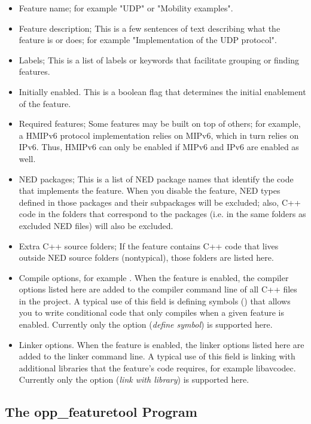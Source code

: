 \begin{itemize}
  \item Feature name; for example "UDP" or "Mobility examples".
  \item Feature description; This is a few sentences of text describing what the feature
    is or does; for example "Implementation of the UDP protocol".
  \item Labels; This is a list of labels or keywords that facilitate grouping or finding features.
  \item Initially enabled. This is a boolean flag that determines the initial enablement
    of the feature.
\item Required features; Some features may be built on top of others; for example, a HMIPv6
    protocol implementation relies on MIPv6, which in turn relies on IPv6. Thus, HMIPv6 can
    only be enabled if MIPv6 and IPv6 are enabled as well.
\item NED packages; This is a list of NED package names that identify the code that implements
    the feature. When you disable the feature, NED types defined in those packages and their
    subpackages will be excluded; also, C++ code in the folders that correspond to the packages
    (i.e. in the same folders as excluded NED files) will also be excluded.
\item Extra C++ source folders; If the feature contains C++ code that lives outside NED source
    folders (nontypical), those folders are listed here.
\item Compile options, for example . When the feature is enabled, the compiler
    options listed here are added to the compiler command line of all C++ files in the project.
    A typical use of this field is defining symbols () that allows you to write conditional code
    that only compiles when a given feature is enabled. Currently only the  option
    (\textit{define symbol}) is supported here.
\item Linker options. When the feature is enabled, the linker options listed here are added
    to the linker command line. A typical use of this field is linking with additional
    libraries that the feature's code requires, for example libavcodec.
    Currently only the  option (\textit{link with library}) is supported here.
\end{itemize}


\subsection{The opp\_featuretool Program}
\label{sec:build-sim-progs:opp-featuretool}

